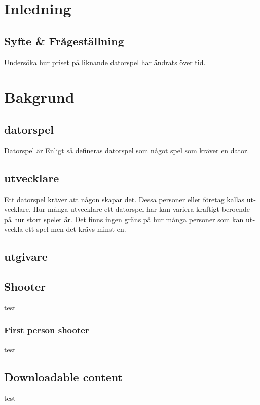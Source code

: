 \documentclass[11p]{article}
\begin{document}
    \begin{otherlanguage}{swedish}
    \tableofcontents

    \newpage

\setlength{\parskip}{10pt}

\section{Inledning}

\subsection{Syfte & Frågeställning}
    Undersöka hur priset på liknande datorspel har ändrats över tid.

\section{Bakgrund}

    \subsection{datorspel}
    Datorspel är
    Enligt \textcite{ComputerSweden} så defineras datorspel som något spel som kräver en dator.
    \subsection{utvecklare}
    Ett datorspel kräver att någon skapar det.
    Dessa personer eller företag kallas utvecklare.
    Hur många utvecklare ett datorspel har kan variera kraftigt beroende på hur stort spelet är.
    Det finns ingen gräns på hur många personer som kan utveckla ett spel men det krävs minst en.
    \subsection{utgivare}

    \subsection{Shooter}
    test
    \subsubsection{First person shooter}
    test
    \subsection{Downloadable content}
    test

\end{otherlanguage}
\end{document}
